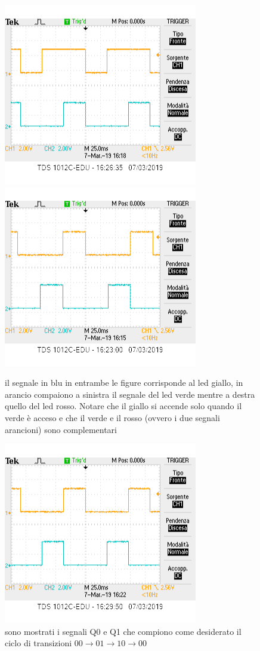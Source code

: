 \documentclass[12pt,a4paper]{article}
\begin{document}
\begin{figure}
	\centering
	\includegraphics[scale=0.8]{yellowandgreen.png}
	\includegraphics[scale=0.8]{yellowandred.png}
	
	\caption{il segnale in blu in entrambe  le figure corrisponde al led giallo, in arancio compaiono a sinistra  il segnale del led verde mentre a destra quello del led rosso. Notare che il giallo si accende solo quando il verde è  acceso e che il verde e il rosso (ovvero i due segnali arancioni) sono complementari}
	
\end{figure}
\begin{figure}
\centering

\includegraphics[scale=0.8]{Q1andQ2}
\caption{sono mostrati i segnali Q0 e Q1 che compiono come desiderato il ciclo di  transizioni $00\to 01 \to 10 \to 00$}
\end{figure}
\end{document}
